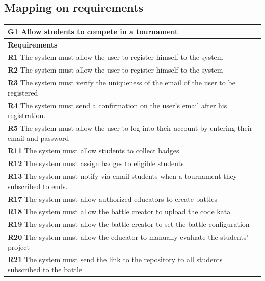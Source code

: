 \subsection{Mapping on requirements}
\begin{table}[H]
    \begin{tabularx}{\textwidth}{X}
        \toprule
        \textbf{G1} Allow students to compete in a tournament                                                       \\ \midrule
        \textbf{Requirements}                                                                                                        \\ \midrule
        \textbf{R1} The system must allow the user to register himself to the system                                                    \\
        \textbf{R2} The system must allow the user to register himself to the system                                         \\ 
        \textbf{R3} The system must verify the uniqueness of the email of the user to be registered                                        \\ 
        \textbf{R4} The system must send a confirmation on the user's email after his registration.                         \\ 
        \textbf{R5} The system must allow the user to log into their account by entering their email and password           \\ 
        \textbf{R11} The system must allow students to collect badges        \\ 
        \textbf{R12} The system must assign badges to eligible students          \\
        \textbf{R13} The system must notify via email students when a tournament they subscribed to ends. \\ 
        \textbf{R17} The system must allow authorized educators to create battles        \\ 
        \textbf{R18} The system must allow the battle creator to upload the code kata       \\ 
        \textbf{R19} The system must allow the battle creator to set the battle configuration                \\ 
        \textbf{R20} The system must allow the educator to manually evaluate the students' project          \\    
        \textbf{R21} The system must send the link to the repository to all students subscribed to the battle            \\ 

\end{tabularx}
\end{table}
